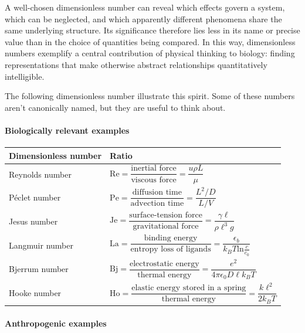 A well-chosen dimensionless number can reveal which effects govern a system, which can be neglected, and which apparently different phenomena share the same underlying structure.
Its significance therefore lies less in its name or precise value than in the choice of quantities being compared.
In this way, dimensionless numbers exemplify a central contribution of physical thinking to biology: finding representations that make otherwise abstract relationships quantitatively intelligible.

The following dimensionless number illustrate this spirit. Some of these numbers aren't canonically named, but they are useful to think about. 

\paragraph{Biologically relevant examples}

\begin{center}
\renewcommand{\arraystretch}{1.8}
\begin{tabularx}{0.94\textwidth}{
    @{}
    >{\raggedright\arraybackslash}p{}
    |
    >{\raggedright\arraybackslash}X
    @{}
}
\hline
\textbf{Dimensionless number} & \textbf{Ratio} \\
\hline
Reynolds number &
$\mathrm{Re}
= \dfrac{\text{inertial force}}{\text{viscous force}}
= \dfrac{u\rho L}{\mu}$ 
\medskip
\\
Péclet number &
$\mathrm{Pe}
= \dfrac{\text{diffusion time}}{\text{advection time}}
= \dfrac{L^2/D}{L/V}$ 
\medskip
\\
Jesus number &
$\mathrm{Je}
= \dfrac{\text{surface-tension force}}{\text{gravitational force}}
= \dfrac{\gamma \ell}{\rho \ell^3 g}$ 
\medskip
\\
Langmuir number &
$\mathrm{La}
= \dfrac{\text{binding energy}}{\text{entropy loss of ligands}}
= \dfrac{\epsilon_b}{k_B T \mathrm{ln}\frac{c}{c_0}}$ 
\medskip
\\
Bjerrum number &
$\mathrm{Bj}
= \dfrac{\text{electrostatic energy}}{\text{thermal energy}}
= \dfrac{e^2}{4 \pi \epsilon_0 D \ell k_B T}$  
\medskip
\\
Hooke number &
$\mathrm{Ho}
= \dfrac{\text{elastic energy stored in a spring}}{\text{thermal energy}}
= \dfrac{k \ell^2}{2k_B T}$ 
\medskip
\\
\hline
\end{tabularx}
\end{center}

\paragraph{Anthropogenic examples}

